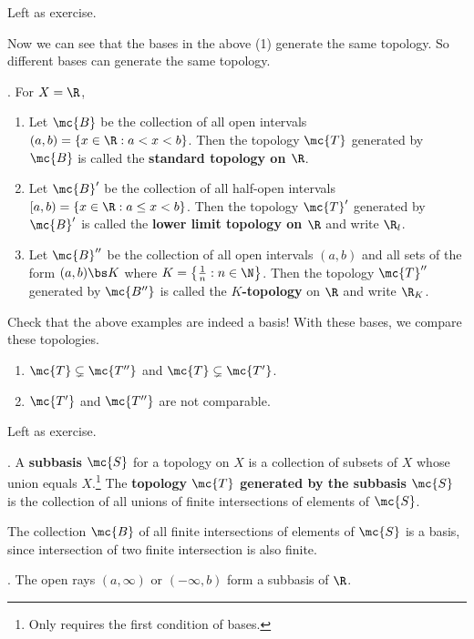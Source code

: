 \pf Left as exercise.

Now we can see that the bases in the above  (1) generate the same topology. So different bases can generate the same topology.

\ex. For \(X = \R\),
\begin{enumerate}
    \item Let \(\mc{B}\) be the collection of all open intervals \((a, b) = \{x \in \R : a < x < b\}\). Then the topology \(\mc{T}\) generated by \(\mc{B}\) is called the \textbf{standard topology on \(\R\)}.
    \item Let \(\mc{B}'\) be the collection of all half-open intervals \([a, b) = \{x \in \R : a \leq x < b\}\). Then the topology \(\mc{T}'\) generated by \(\mc{B}'\) is called the \textbf{lower limit topology on \(\R\)} and write \(\R_l\).
    \item Let \(\mc{B}''\) be the collection of all open intervals \((a, b)\) and all sets of the form \((a, b) \bs K\) where \(K = \left\{\frac{1}{n} : n \in \N\right\}\). Then the topology \(\mc{T}''\) generated by \(\mc{B''}\) is called the \textbf{\(K\)-topology} on \(\R\) and write \(\R_K\).
\end{enumerate}

Check that the above examples are indeed a basis! With these bases, we compare these topologies.

\begin{enumerate}
    \item \(\mc{T} \subsetneq \mc{T''}\) and \(\mc{T} \subsetneq \mc{T'}\).
    \item \(\mc{T'}\) and \(\mc{T''}\) are not comparable.
\end{enumerate}

\pf Left as exercise.

.  A \textbf{subbasis} \(\mc{S}\) for a topology on \(X\) is a collection of subsets of \(X\) whose union equals \(X\).\footnote{Only requires the first condition of bases.} The \textbf{topology \(\mc{T}\) generated by the subbasis \(\mc{S}\)} is the collection of all unions of finite intersections of elements of \(\mc{S}\).

The collection \(\mc{B}\) of all finite intersections of elements of \(\mc{S}\) is a basis, since intersection of two finite intersection is also finite.

\ex. The open rays \((a, \infty)\) or \((-\infty, b)\) form a subbasis of \(\R\).



